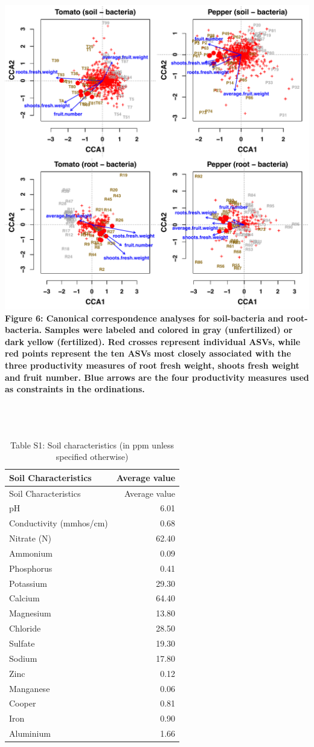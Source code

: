 \documentclass[11pt,]{article}
\begin{document}
\includegraphics{../figures/bacteria/Figure6b_rda.pdf}\\
\textbf{Figure 6: Canonical correspondence analyses for soil-bacteria
and root-bacteria. Samples were labeled and colored in gray
(unfertilized) or dark yellow (fertilized). Red crosses represent
individual ASVs, while red points represent the ten ASVs most closely
associated with the three productivity measures of root fresh weight,
shoots fresh weight and fruit number. Blue arrows are the four
productivity measures used as constraints in the ordinations.} ~\\
\hspace*{0.333em}\\
\hspace*{0.333em} ~\\
\hspace*{0.333em} ~\\
\newpage 

\begin{longtable}[]{@{}lr@{}}
\caption{Table S1: Soil characteristics (in ppm unless specified
otherwise)}\tabularnewline
\toprule
Soil Characteristics & Average value\tabularnewline
\midrule
\endfirsthead
\toprule
Soil Characteristics & Average value\tabularnewline
\midrule
\endhead
pH & 6.01\tabularnewline
Conductivity (mmhos/cm) & 0.68\tabularnewline
Nitrate (N) & 62.40\tabularnewline
Ammonium & 0.09\tabularnewline
Phosphorus & 0.41\tabularnewline
Potassium & 29.30\tabularnewline
Calcium & 64.40\tabularnewline
Magnesium & 13.80\tabularnewline
Chloride & 28.50\tabularnewline
Sulfate & 19.30\tabularnewline
Sodium & 17.80\tabularnewline
Zinc & 0.12\tabularnewline
Manganese & 0.06\tabularnewline
Cooper & 0.81\tabularnewline
Iron & 0.90\tabularnewline
Aluminium & 1.66\tabularnewline
\bottomrule
\end{longtable}
\end{document}
